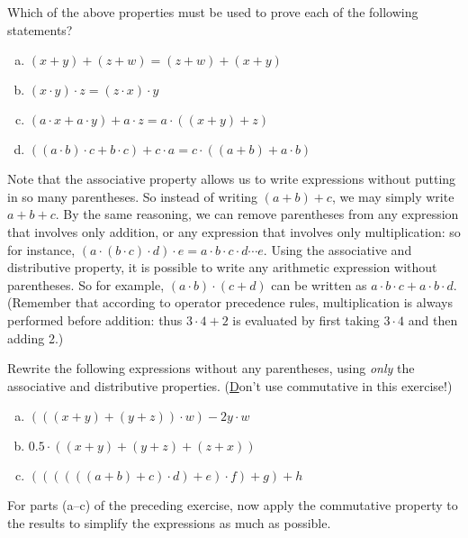 \begin{exercise}{}
Which of the above properties must be used to prove each of the following statements?
\begin{enumerate}[(a)]
\item
$(x+y)+(z+w) = (z+w)+(x+y)$
\item
$(x \cdot y) \cdot z = ( z \cdot  x) \cdot y$
\item
$(a\cdot x + a \cdot y) + a \cdot z = a \cdot ( (x+y) + z)$
\item
$((a \cdot b) \cdot c + b \cdot c) + c \cdot a = c \cdot ((a+b) + a \cdot b)$
\end{enumerate}
\end{exercise} 

Note that the associative property allows us to write expressions without putting in so many parentheses.  So instead of writing $(a+b)+c$, we may simply write $a+b+c$. By the same reasoning, we can remove parentheses from any expression that involves only addition, or any expression that involves only multiplication: so for instance, $(a \cdot (b \cdot c) \cdot d) \cdot e = a \cdot b \cdot c \cdot d \cdots e$. Using the associative and distributive property, it is possible to write any arithmetic expression without parentheses. So for example, $(a \cdot b) \cdot (c + d)$ can be written as $a \cdot b \cdot c + a \cdot b \cdot d$.  (Remember that according to operator precedence rules, multiplication is always performed before addition: thus $3 \cdot 4 + 2$ is evaluated by first taking $3 \cdot 4$ and then adding 2.)

\begin{exercise}{}
Rewrite the following expressions without any parentheses, using \emph{only} the  associative and distributive properties.  ({\underline Don't use commutative in this exercise!})
\begin{enumerate}[(a)]
\item
$(((x + y) + (y+z))\cdot w) - 2y \cdot w$
\item
$0.5 \cdot ( (x+y) + (y + z) + (z + x))$
\item
$((((((a+b)+c) \cdot d)+ e) \cdot f) + g) + h$
\end{enumerate}
\end{exercise}

\begin{exercise}{}
For parts (a--c) of the preceding exercise, now apply the commutative property to the results to simplify the expressions as much as possible.
\end{exercise}

